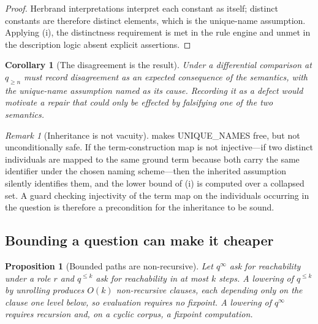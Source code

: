 \documentclass[11pt,a4paper]{article}
\theoremstyle{plain}
\newtheorem{proposition}[theorem]{Proposition}
\newtheorem{corollary}[theorem]{Corollary}
\theoremstyle{definition}
\theoremstyle{remark}
\newtheorem{remark}[theorem]{Remark}
\newcommand{\qq}{q}
\begin{document}
\begin{proof}
Herbrand interpretations interpret each constant as itself; distinct constants
are therefore distinct elements, which is the unique-name assumption. Applying
(i), the distinctness requirement is met in the rule
engine and unmet in the description logic absent explicit assertions.
\end{proof}

\begin{corollary}[The disagreement is the result]
\label{cor:disagree-result}
Under  a differential comparison at $\qq_{\geq n}$
must record disagreement as an expected consequence of the semantics, with the
unique-name assumption named as its cause. Recording it as a defect would
motivate a repair that could only be effected by falsifying one of the two
semantics.
\end{corollary}

\begin{remark}[Inheritance is not vacuity]
\label{rem:inheritance-guard}
 makes \textsf{UNIQUE\_NAMES} free, but not
unconditionally safe. If the term-construction map is not injective---if two
distinct individuals are mapped to the same ground term because both carry the
same identifier under the chosen naming scheme---then the inherited assumption
silently identifies them, and the lower bound of
(i) is computed over a collapsed set. A guard
checking injectivity of the term map on the individuals occurring in the
question is therefore a precondition for the inheritance to be sound.
\end{remark}

\subsection{Bounding a question can make it cheaper}

\begin{proposition}[Bounded paths are non-recursive]
\label{prop:bounded-cheaper}
Let $\qq^\infty$ ask for reachability under a role $r$ and $\qq^{\leq k}$ ask
for reachability in at most $k$ steps. A lowering of $\qq^{\leq k}$ by
unrolling produces $O(k)$ non-recursive clauses, each depending only on the
clause one level below, so evaluation requires no fixpoint. A lowering of
$\qq^\infty$ requires recursion and, on a cyclic corpus, a fixpoint
computation.
\end{proposition}
\end{document}

